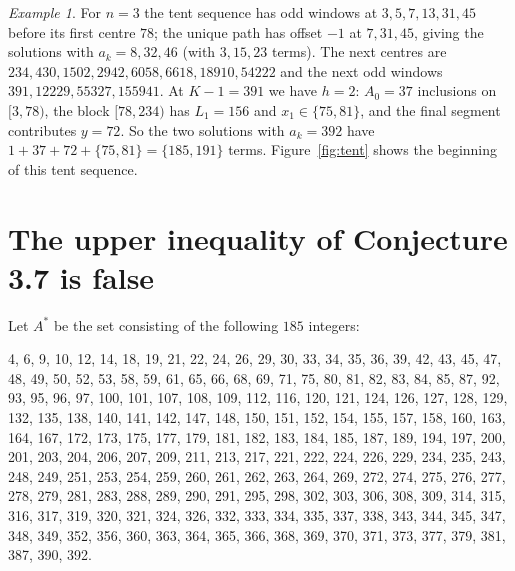 \documentclass[11pt]{amsart}
\theoremstyle{definition}
\theoremstyle{remark}
\newtheorem{example}[theorem]{Example}
\begin{document}
\begin{example}\label{ex:n3}
For $n=3$ the tent sequence has odd windows at $3,5,7,13,31,45$ before its first centre $78$; the unique path has offset $-1$ at $7,31,45$, giving the solutions with $a_k=8,32,46$ (with $3,15,23$ terms). The next centres are $234,430,1502,2942,6058,6618,18910,54222$ and the next odd windows $391,12229,55327,155941$. At $K-1=391$ we have $h=2$: $A_0=37$ inclusions on $[3,78)$, the block $[78,234)$ has $L_1=156$ and $x_1\in\{75,81\}$, and the final segment contributes $y=72$. So the two solutions with $a_k=392$ have $1+37+72+\{75,81\}=\{185,191\}$ terms. Figure~\ref{fig:tent} shows the beginning of this tent sequence.
\end{example}

\section{The upper inequality of Conjecture 3.7 is false}\label{sec:counter}

\noindent\begin{minipage}{\textwidth}
Let $A^*$ be the set consisting of the following $185$ integers:
\begin{center}\begin{minipage}{0.94\textwidth}\small\raggedright
4, 6, 9, 10, 12, 14, 18, 19, 21, 22, 24, 26, 29, 30, 33, 34, 35, 36, 39, 42, 43, 45, 47, 48, 49, 50, 52, 53, 58, 59, 61, 65, 66, 68, 69, 71, 75, 80, 81, 82, 83, 84, 85, 87, 92, 93, 95, 96, 97, 100, 101, 107, 108, 109, 112, 116, 120, 121, 124, 126, 127, 128, 129, 132, 135, 138, 140, 141, 142, 147, 148, 150, 151, 152, 154, 155, 157, 158, 160, 163, 164, 167, 172, 173, 175, 177, 179, 181, 182, 183, 184, 185, 187, 189, 194, 197, 200, 201, 203, 204, 206, 207, 209, 211, 213, 217, 221, 222, 224, 226, 229, 234, 235, 243, 248, 249, 251, 253, 254, 259, 260, 261, 262, 263, 264, 269, 272, 274, 275, 276, 277, 278, 279, 281, 283, 288, 289, 290, 291, 295, 298, 302, 303, 306, 308, 309, 314, 315, 316, 317, 319, 320, 321, 324, 326, 332, 333, 334, 335, 337, 338, 343, 344, 345, 347, 348, 349, 352, 356, 360, 363, 364, 365, 366, 368, 369, 370, 371, 373, 377, 379, 381, 387, 390, 392.
\end{minipage}\end{center}
\end{minipage}
\end{document}
